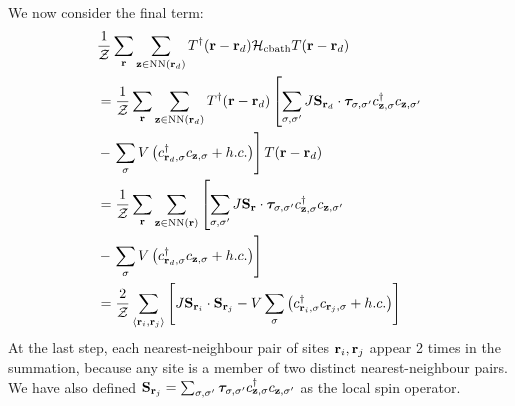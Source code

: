 \documentclass[reprint,hidelinks]{revtex4-2}
\begin{document}
We now consider the final term:
\begin{equation}\begin{aligned}
	&\frac{1}{\mathcal{Z}}\sum_{{\bf r}}\sum_{{\bf z}\in\text{NN}({\bf r}_d)}T^\dagger({\bf r} - {\bf r}_d)\mathcal{H}_\text{cbath}T({\bf r} - {\bf r}_d)\\
	&=\frac{1}{\mathcal{Z}}\sum_{{\bf r}}\sum_{{\bf z}\in\text{NN}({\bf r}_d)}T^\dagger({\bf r} - {\bf r}_d)\left[\sum_{\sigma,\sigma^\prime}J {\bf S}_{{\bf r}_d}\cdot{\boldsymbol \tau}_{\sigma,\sigma^\prime}c^\dagger_{{\bf z},\sigma}c_{{\bf z},\sigma^\prime} \right.\\
				     &-  \left.\sum_{\sigma} V \left(c^\dagger_{{\bf r}_d,\sigma} c_{{{\bf z}},\sigma} + h.c.\right)\right]T({\bf r} - {\bf r}_d)\\
	&=\frac{1}{\mathcal{Z}}\sum_{{\bf r}}\sum_{{\bf z}\in\text{NN}({\bf r})}\left[\sum_{\sigma,\sigma^\prime}J {\bf S}_{{\bf r}}\cdot{\boldsymbol \tau}_{\sigma,\sigma^\prime}c^\dagger_{{\bf z},\sigma}c_{{\bf z},\sigma^\prime} \right.\\
				     &-  \left.\sum_{\sigma} V\left(c^\dagger_{{\bf r}_d,\sigma} c_{{{\bf z}},\sigma} + h.c.\right)\right]\\
					 &=\frac{2}{\mathcal{Z}}\sum_{\left< {\bf r}_i, {\bf r}_j\right>}\left[J {\bf S}_{{\bf r}_i}\cdot{\bf S}_{{\bf r}_j} - V \sum_{\sigma}\left(c^\dagger_{{\bf r}_i,\sigma} c_{{{\bf r}_j},\sigma} + h.c.\right)\right]\\
\end{aligned}\end{equation}
At the last step, each nearest-neighbour pair of sites \({\bf r}_i, {\bf r}_j\) appear 2 times in the summation, because any site is a member of two distinct nearest-neighbour pairs. We have also defined \({\bf S}_{{\bf r}_j} =\sum_{\sigma,\sigma^\prime} {\boldsymbol \tau}_{\sigma,\sigma^\prime}c^\dagger_{{\bf z},\sigma}c_{{\bf z},\sigma^\prime}\) as the local spin operator.
\end{document}
